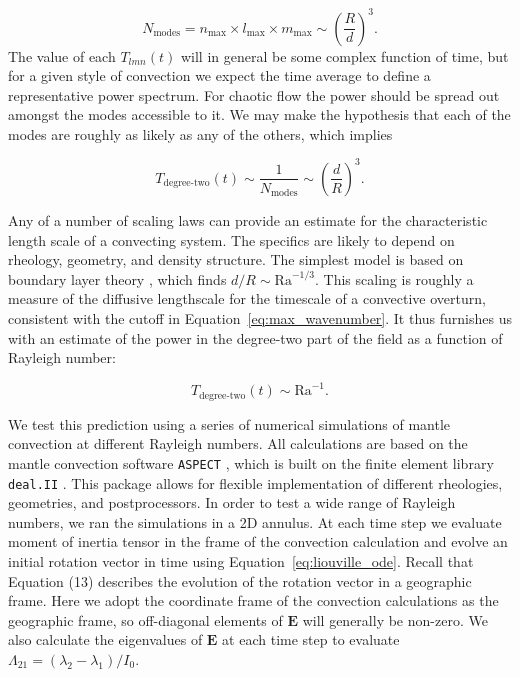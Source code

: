 \documentclass[preprint,12pt,authoryear]{elsarticle}
\begin{document}
\begin{equation}
N_{\text{modes}} = n_{\text{max}} \times l_{\text{max}} \times m_{\text{max}} \sim \left( \frac{R}{d} \right)^{3}.
\end{equation}
The value of each $T_{lmn}(t)$ will in general be some complex function of time, but for a given style of convection we expect the time average to define a representative power spectrum.
For chaotic flow the power should be spread out amongst the modes accessible to it.
We may make the hypothesis that each of the modes are roughly as likely as any of the others, which implies

\begin{equation}
T_{\text{degree-two}}(t) \sim \frac{1}{N_{\text{modes}}} \sim \left( \frac{d}{R}\right)^3.
\end{equation}

Any of a number of scaling laws can provide an estimate for the characteristic length scale of a convecting system. The specifics are likely to depend on rheology, geometry, and density structure.
The simplest model is based on boundary layer theory \citep{turcotte1967finite}, which finds $d/R \sim \mathrm{Ra}^{-1/3}$.
This scaling is roughly a measure of the diffusive lengthscale for the timescale of a convective overturn, consistent
with the cutoff in Equation~\eqref{eq:max_wavenumber}.
It thus furnishes us with an estimate of the power in 
the degree-two part of the field as a function of Rayleigh number:

\begin{equation}
T_{\text{degree-two}}(t) \sim \mathrm{Ra}^{-1}.
\label{eq:degree_two_of_ra}
\end{equation}

We test this prediction using a series of numerical simulations of mantle convection at different Rayleigh numbers. 
All calculations are based on the mantle convection software \texttt{ASPECT} \citep{kronbichler2012high}, which is built on the finite element library \texttt{deal.II} \citep{dealII82}. This package
 allows for flexible implementation of different rheologies, geometries, and postprocessors.
In order to test a wide range of Rayleigh numbers, we ran the simulations in a 2D annulus. At each time step we evaluate moment of inertia tensor in the frame of the convection calculation and evolve an initial rotation vector in time using  Equation~\eqref{eq:liouville_ode}. Recall that Equation (13) describes the evolution of the rotation vector in a geographic frame. Here we adopt the coordinate frame of the convection calculations as the geographic frame, so off-diagonal elements of $\mathbf{E}$ will generally be non-zero. We also calculate the eigenvalues of $\mathbf{E}$ at each time step to evaluate $\Lambda_{21} = (\lambda_2 - \lambda_1)/I_0$.
\end{document}
